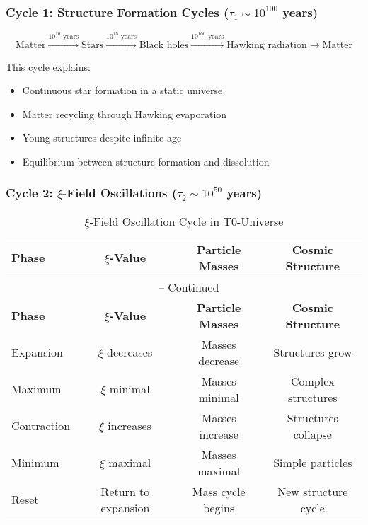 \documentclass[12pt,a4paper]{article}
\theoremstyle{definition}
\begin{document}
	\subsubsection{Cycle 1: Structure Formation Cycles ($\tau_1 \sim 10^{100}$ years)}
	
	\begin{equation}
		\text{Matter} \xrightarrow{10^{10} \text{ years}} \text{Stars} \xrightarrow{10^{15} \text{ years}} \text{Black holes} \xrightarrow{10^{100} \text{ years}} \text{Hawking radiation} \rightarrow \text{Matter}
	\end{equation}
	
	This cycle explains:
	\begin{itemize}
		\item Continuous star formation in a static universe
		\item Matter recycling through Hawking evaporation
		\item Young structures despite infinite age
		\item Equilibrium between structure formation and dissolution
	\end{itemize}
	
	\subsubsection{Cycle 2: $\xi$-Field Oscillations ($\tau_2 \sim 10^{50}$ years)}
	
	\begin{longtable}{lccc}
		\caption{$\xi$-Field Oscillation Cycle in T0-Universe} \\
		\toprule
		\textbf{Phase} & \textbf{$\xi$-Value} & \textbf{Particle Masses} & \textbf{Cosmic Structure} \\
		\midrule
		\endfirsthead
		\multicolumn{4}{c}{\tablename\ \thetable{} -- Continued} \\
		\toprule
		\textbf{Phase} & \textbf{$\xi$-Value} & \textbf{Particle Masses} & \textbf{Cosmic Structure} \\
		\midrule
		\endhead
		Expansion & $\xi$ decreases & Masses decrease & Structures grow \\
		Maximum & $\xi$ minimal & Masses minimal & Complex structures \\
		Contraction & $\xi$ increases & Masses increase & Structures collapse \\
		Minimum & $\xi$ maximal & Masses maximal & Simple particles \\
		Reset & Return to expansion & Mass cycle begins & New structure cycle \\
		\bottomrule
	\end{longtable}
	
\end{document}
